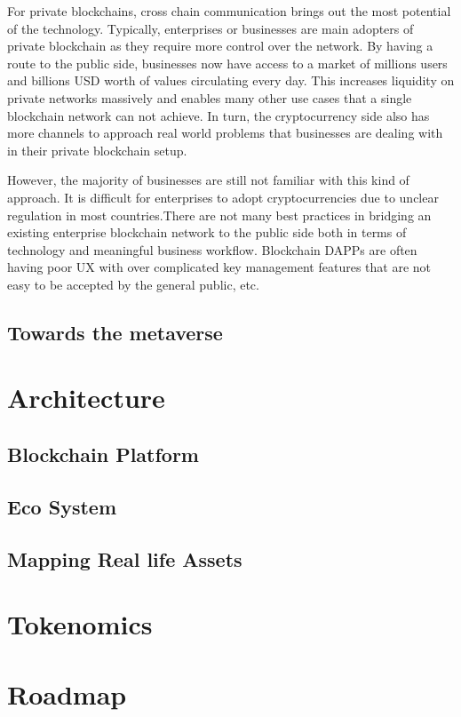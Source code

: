\documentclass[12pt]{article}
\begin{document}
For private blockchains, cross chain communication brings out the most potential of the technology. Typically, enterprises or businesses are main adopters of private blockchain as they  require more control over the network. By having a route to the public side, businesses now have access to a market of millions users and billions USD worth of values circulating every day. This increases liquidity on private networks massively and enables many other use cases that a single blockchain network can not achieve. In turn, the cryptocurrency side also has more channels to approach real world problems that businesses are dealing with in their private blockchain setup. 

However, the majority of businesses are still not familiar with this kind of approach. It is difficult for enterprises to adopt cryptocurrencies due to unclear regulation in most countries.There are not many best practices in bridging an existing enterprise blockchain network to the public side both in terms of technology and meaningful business workflow. Blockchain DAPPs are often having poor UX with over complicated key management features that are not easy to be accepted by the general public, etc. 

\subsection{Towards the metaverse}

\section{Architecture}

\subsection{Blockchain Platform}

\subsection{Eco System}

\subsection{Mapping Real life Assets}


\section{Tokenomics}

\section{Roadmap}



\end{document}
